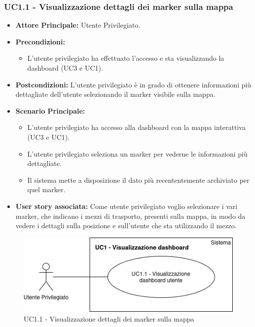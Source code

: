 \documentclass[11pt]{article}
\begin{document}
\begin{justify}
\subsubsection{\textbf{UC1.1 - Visualizzazione dettagli dei marker sulla mappa}}
\begin{itemize}
     \item \textbf{Attore Principale:} Utente Privilegiato.
     \item \textbf{Precondizioni:}
        \begin{itemize}
    		\item L'utente privilegiato ha effettuato l'accesso e sta      visualizzando la dashboard (UC3 e UC1).
        \end{itemize}
     \item \textbf{Postcondizioni:} L'utente privilegiato è in grado di ottenere informazioni più dettagliate dell'utente selezionando il marker visibile sulla mappa.
     \item \textbf{Scenario Principale:}
        \begin{itemize}
            \item L'utente privilegiato ha accesso alla dashboard con la mappa interattiva (UC3 e UC1).
            \item L'utente privilegiato seleziona un marker per vederne le informazioni più dettagliate.
            \item Il sistema mette a disposizione il dato più recententemente archiviato per quel marker.
        \end{itemize}
     \item \textbf{User story associata:}
     Come utente privilegiato voglio selezionare i vari marker, che indicano i mezzi di trasporto, presenti sulla mappa, in modo da vedere i dettagli sulla posizione e sull'utente che sta utilizzando il mezzo.
\end{itemize}
\begin{figure}[H]
    \centering
    \includegraphics[width=0.5\linewidth]{UC1.1image.png}
    \caption{UC1.1 - Visualizzazione dettagli dei marker sulla mappa}
    \label{fig:UC1.1}
\end{figure}

\end{justify}
\end{document}
